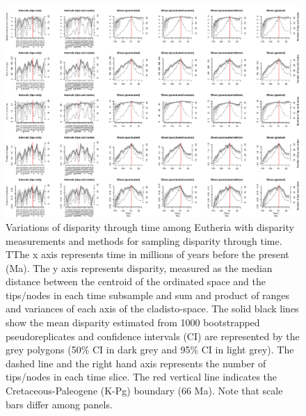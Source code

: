 \begin{landscape}
\begin{figure}[!htbp]
\centering
    \includegraphics[width=\textwidth,height=\textheight,keepaspectratio]{Supplementaries/Figures/STD/Eutheria_all_methods.pdf}
\caption[Comparison of all the disparity metrics and all the time series methods for Eutheria]{Variations of disparity through time among Eutheria with disparity measurements and methods for sampling disparity through time. TThe x axis represents time in millions of years before the present (Ma). The y axis represents disparity, measured as the median distance between the centroid of the ordinated space and the tips/nodes in each time subsample and sum and product of ranges and variances of each axis of the cladisto-space. The solid black lines show the mean disparity estimated from 1000 bootstrapped pseudoreplicates and confidence intervals (CI) are represented by the grey polygons (50\% CI in dark grey and 95\% CI in light grey). The dashed line and the right hand axis represents the number of tips/nodes in each time slice. The red vertical line indicates the Cretaceous-Paleogene (K-Pg) boundary (66 Ma). Note that scale bars differ among panels.}
\label{Supp_disparity_all_Eutheria}
\end{figure}
\end{landscape}

